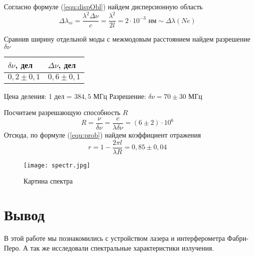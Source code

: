 Согласно формуле (\ref{equ:dispObl}) найдем дисперсионную область
\begin{equation*}
	\Delta\lambda_{si} = \frac{\lambda^2\Delta\nu}{c} = \frac{\lambda^2}{2l} = 2\cdot10^{-3} \text{ нм} \sim \Delta\lambda(Ne)
\end{equation*}

Сравнив ширину отдельной моды с межмодовым расстоянием найдем разрешение $\delta\nu$
\begin{table}[H]
	\centering
	\begin{tabular}{|l|l|}
		\hline
		$\delta\nu$, дел & $\Delta\nu$, дел \\ \hline
		$0,2\pm 0,1$     & $0,6\pm 0,1$     \\ \hline
	\end{tabular}
\end{table}
Цена деления: 1 дел = $384,5$ МГц
Разрешение: $\delta\nu = 70 \pm 30$ МГц

Посчитаем разрешающую способность $R$
\begin{equation*}
	R = \frac{\nu}{\delta\nu} =\frac{c}{\lambda\delta\nu} = (6 \pm 2)\cdot10^{6}
\end{equation*}
Отсюда, по формуле (\ref{equ:prob}) найдем коэффициент отражения
\begin{equation*}
	r= 1-\frac{2\pi l}{\lambda R} = 0,85\pm 0,04
\end{equation*}

\begin{figure}[H]
	\centering
	\texttt{[image: spectr.jpg]}
	\caption{Картина спектра}
\end{figure}



\section{Вывод}

В этой работе мы познакомились с устройством лазера и интерферометра Фабри-Перо. А так же исследовали спектральные характеристики излучения.

